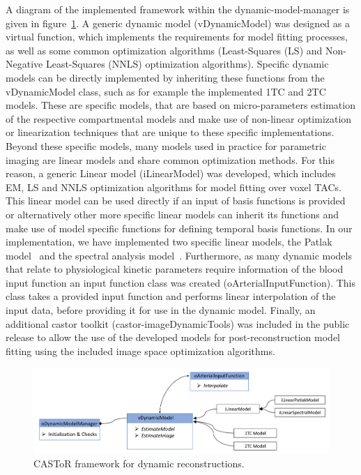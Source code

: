 A diagram of the implemented framework within the dynamic-model-manager is given in figure~\ref{fig3_2:DynamicModelManager}. 
A generic dynamic model (vDynamicModel) was designed as a virtual function, which implements the requirements for model fitting processes, as well as some common optimization algorithms (Least-Squares (LS) and Non-Negative Least-Squares (NNLS) optimization algorithms).
Specific dynamic models can be directly implemented by inheriting these functions from the vDynamicModel class, such as for example the implemented 1TC and 2TC models. These are specific models, that are based on micro-parameters estimation of the respective compartmental models and make use of non-linear optimization or linearization techniques that are unique to these specific implementations. 
Beyond these specific models, many models used in practice for parametric imaging are linear models and share common optimization methods. For this reason, a generic Linear model (iLinearModel) was developed, which includes EM, LS and NNLS optimization algorithms for model fitting over voxel TACs. This linear model can be used directly if an input of basis functions is provided or alternatively other more specific linear models can inherit its functions and make use of model specific functions for defining temporal basis functions.
In our implementation, we have implemented two specific linear models, the Patlak model~\cite{Patlak1985} and the spectral analysis model~\cite{Cunningham1993}. 
Furthermore, as many dynamic models that relate to physiological kinetic parameters require information of the blood input function an input function class was created (oArterialInputFunction). This class takes a provided input function and performs linear interpolation of the input data, before providing it for use in the dynamic model. 
Finally, an additional castor toolkit (castor-imageDynamicTools) was included in the public release to allow the use of the developed models for post-reconstruction model fitting using the included image space optimization algorithms. 

\begin{figure} [ht!]
\centering
\includegraphics[scale=0.48,angle=0]{3_Results/3_2_Dynamic_Reconstruction_SimulationStudy/figures/oDynamicModelManager.pdf}
\caption{CASToR framework for dynamic reconstructions.} 
\label{fig3_2:DynamicModelManager}
\end{figure}

